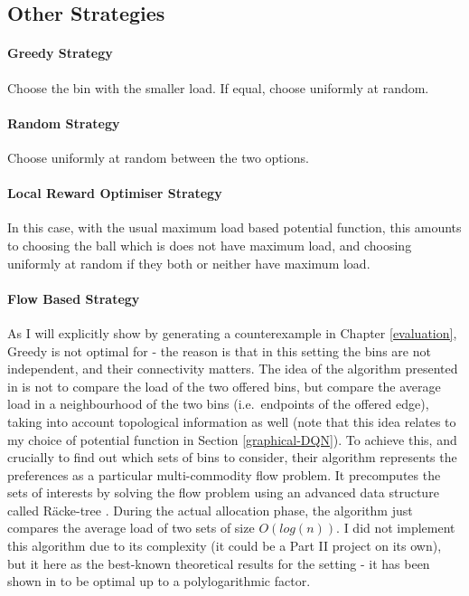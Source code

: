 \subsection{Other Strategies} \label{graphical-otherstrategies}


\paragraph{Greedy Strategy} Choose the bin with the smaller load. If equal, choose uniformly at random.


\paragraph{Random Strategy} Choose uniformly at random between the two options.



\paragraph{Local Reward Optimiser Strategy} In this case, with the usual maximum load based potential function, this amounts to choosing the ball which is does not have maximum load, and choosing uniformly at random if they both or neither have maximum load.


\paragraph{Flow Based Strategy}

As I will explicitly show by generating a counterexample in Chapter \ref{evaluation}, Greedy is not optimal for \GraphicalTwoChoice - the reason is that in this setting the bins are not independent, and their connectivity matters. The idea of the algorithm presented in \cite{bansal2021twochoicegraphical} is not to compare the load of the two offered bins, but compare the average load in a neighbourhood of the two bins (i.e.\ endpoints of the offered edge), taking into account topological information as well (note that this idea relates to my choice of potential function in Section \ref{graphical-DQN}). To achieve this, and crucially to find out which sets of bins to consider, their algorithm represents the preferences as a particular multi-commodity flow problem. It precomputes the sets of interests by solving the flow problem using an advanced data structure called R\"{a}cke-tree \cite{racke2008racketree}. During the actual allocation phase, the algorithm just compares the average load of two sets of size $O(log(n))$. I did not implement this algorithm due to its complexity (it could be a Part II project on its own), but it here as the best-known theoretical results for the \GraphicalTwoChoice setting - it has been shown in \cite{bansal2021twochoicegraphical} to be optimal up to a polylogarithmic factor.


